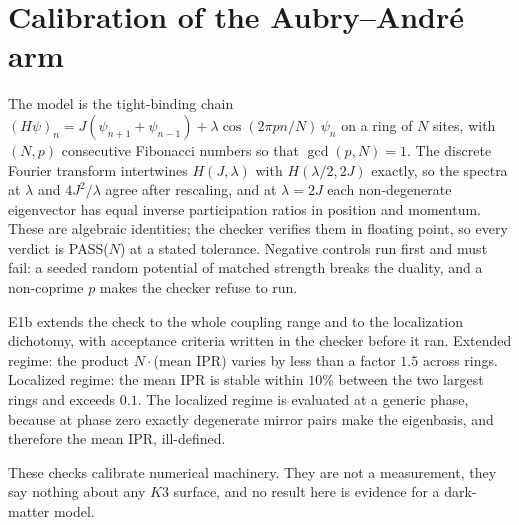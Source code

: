 \documentclass[11pt,a4paper]{article}
\begin{document}
\section{Calibration of the Aubry--Andr\'e arm}\label{sec:e1}

The model is the tight-binding chain $(H\psi)_n = J(\psi_{n+1}+\psi_{n-1}) + \lambda\cos(2\pi pn/N)\,\psi_n$ on a
ring of $N$ sites, with $(N,p)$ consecutive Fibonacci numbers so that $\gcd(p,N)=1$. The discrete Fourier
transform intertwines $H(J,\lambda)$ with $H(\lambda/2,2J)$ exactly, so the spectra at $\lambda$ and $4J^2/\lambda$
agree after rescaling, and at $\lambda=2J$ each non-degenerate eigenvector has equal inverse participation
ratios in position and momentum. These are algebraic identities; the checker verifies them in floating point,
so every verdict is PASS($N$) at a stated tolerance. Negative controls run first and must fail: a seeded
random potential of matched strength breaks the duality, and a non-coprime $p$ makes the checker refuse to
run.

\begin{table}[h]
\centering\small

\caption{E1, tolerance $10^{-9}$. Gaps are maxima over $\lambda\in\{0.5,1,3\}J$; the control column is the
smallest duality gap produced by the random potential, which must be large.}\label{tab:e1}
\end{table}

E1b extends the check to the whole coupling range and to the localization dichotomy, with acceptance criteria
written in the checker before it ran. Extended regime: the product $N\cdot$(mean IPR) varies by less than a
factor $1.5$ across rings. Localized regime: the mean IPR is stable within $10\%$ between the two largest rings
and exceeds $0.1$. The localized regime is evaluated at a generic phase, because at phase zero exactly
degenerate mirror pairs make the eigenbasis, and therefore the mean IPR, ill-defined.

\begin{table}[h]
\centering\small

\caption{E1b scaling ($J=1$). The crossing of mean IPR in position and momentum changes sign at $\lambda=2J$
for every coupling tested. Rows in the near-critical band are reported, not claimed.}\label{tab:e1b}
\end{table}

These checks calibrate numerical machinery. They are not a measurement, they say nothing about any $K3$
surface, and no result here is evidence for a dark-matter model.
\end{document}
